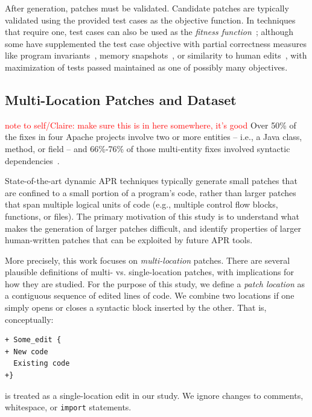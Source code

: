\documentclass[10pt, conference]{IEEEtran}
\newcommand\todo[1]{\textcolor{red}{#1}}
\begin{document}
After generation, patches must be validated. Candidate patches are typically
validated using the provided test cases as the objective function. In techniques
that require one, test cases can also be used as the \emph{fitness
  function}~\cite{genprog}; although some have supplemented the test case
objective with partial correctness measures like program
invariants~\cite{dinglyu}, memory snapshots~\cite{source-code-checkpoint}, or
similarity to human edits~\cite{hdrepair}, with maximization of tests passed
maintained as one of possibly many objectives.


\subsection{Multi-Location Patches and Dataset}

\todo{note to self/Claire: make sure this is in here somewhere, it's good}
  Over 50\% of the fixes in four 
Apache projects involve two or more entities -- i.e., a Java class, method, or field -- and 66\%-76\% of 
those multi-entity fixes involved syntactic dependencies~\cite{wang2018}. 

State-of-the-art dynamic APR techniques typically generate small patches that
are confined to a small portion of a program's code, rather than larger patches
that span multiple logical units of code (e.g., multiple control flow blocks,
functions, or files). The primary motivation of this study is to understand what
makes the generation of larger patches difficult, and identify properties of
larger human-written patches that can be exploited by future APR tools.

More precisely, this work focuses on \emph{multi-location} patches. There are
several plausible definitions of multi- vs. single-location patches, with
implications for how they are studied. For the purpose of this study, we define
a \emph{patch location} as a contiguous sequence of edited lines of code.  We
combine two locations if one simply opens or closes a syntactic block inserted
by the other. That is, conceptually:
\begin{lstlisting}
+ Some_edit {
+ New code
  Existing code
+}
\end{lstlisting}
is treated as a single-location edit in our study. We ignore changes to
comments, whitespace, or \texttt{import} statements.
\end{document}
